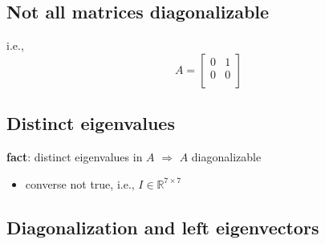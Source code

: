 \documentclass[10pt,letterpaper]{article}
\begin{document}
\subsection{Not all matrices diagonalizable}
\label{sec-11_3}

i.e.,
$$
A=
\begin{bmatrix}
  0 & 1 \\
  0 & 0 \\
\end{bmatrix}
$$ 
\subsection{Distinct eigenvalues}
\label{sec-11_4}

\textbf{fact}: distinct eigenvalues in $A$ $\Rightarrow$ $A$ diagonalizable
\begin{itemize}
\item converse not true, i.e., $I \in \mathbb{R}^{7\times 7}$
\end{itemize}
\subsection{Diagonalization and left eigenvectors}
\label{sec-11_5}
\end{document}
